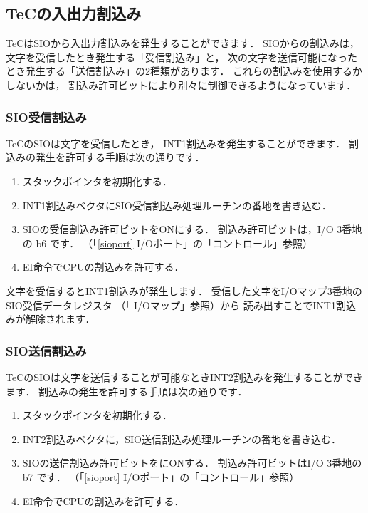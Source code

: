 \subsection{TeCの入出力割込み}
TeCはSIOから入出力割込みを発生することができます．
SIOからの割込みは，
文字を受信したとき発生する「受信割込み」と，
次の文字を送信可能になったとき発生する「送信割込み」の2種類があります．
これらの割込みを使用するかしないかは，
割込み許可ビットにより別々に制御できるようになっています．

\subsubsection{SIO受信割込み}
TeCのSIOは文字を受信したとき，
INT1割込みを発生することができます．
割込みの発生を許可する手順は次の通りです．

\begin{enumerate}
\item スタックポインタを初期化する．
\item INT1割込みベクタにSIO受信割込み処理ルーチンの番地を書き込む．
\item SIOの受信割込み許可ビットをONにする．
割込み許可ビットは，I/O 3番地の b6 です．
（「\ref{sioport} I/Oポート」の「コントロール」参照）
\item EI命令でCPUの割込みを許可する．

\end{enumerate}

文字を受信するとINT1割込みが発生します．
受信した文字をI/Oマップ3番地のSIO受信データレジスタ
（「 I/Oマップ」参照）から
読み出すことでINT1割込みが解除されます．


\subsubsection{SIO送信割込み}

TeCのSIOは文字を送信することが可能なときINT2割込みを発生することができます．
割込みの発生を許可する手順は次の通りです．

\begin{enumerate}
\item スタックポインタを初期化する．
\item INT2割込みベクタに，SIO送信割込み処理ルーチンの番地を書き込む．
\item SIOの送信割込み許可ビットをにONする．
割込み許可ビットはI/O 3番地の b7 です．
（「\ref{sioport} I/Oポート」の「コントロール」参照）
\item EI命令でCPUの割込みを許可する．
\end{enumerate}

